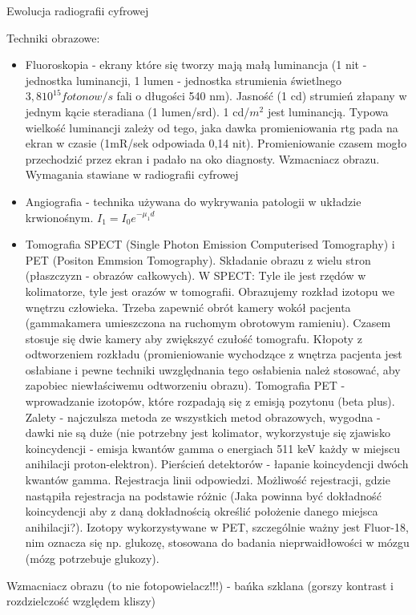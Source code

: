 \documentclass{article}
\begin{document}
Ewolucja radiografii cyfrowej

Techniki obrazowe:
\begin{itemize}
    \item Fluoroskopia - ekrany które się tworzy mają małą luminancja (1 nit - jednostka luminancji, 1 lumen - jednostka strumienia świetlnego $3,8 10^{15} fotonow/s$ fali o długości 540 nm). Jasność (1 cd) strumień złapany w jednym kącie steradiana (1 lumen\slash srd). 1 cd\slash $m^2$ jest luminancją. Typowa wielkość luminancji zależy od tego, jaka dawka promieniowania rtg pada na ekran w czasie (1mR/sek odpowiada 0,14 nit). Promieniowanie czasem mogło przechodzić przez ekran i padało na oko diagnosty. Wzmacniacz obrazu. Wymagania stawiane w radiografii cyfrowej
    \item Angiografia - technika używana do wykrywania patologii w układzie krwionośnym. $I_1 = I_0 e^{-\mu_1 d}$
    \item Tomografia SPECT (Single Photon Emission Computerised Tomography) i PET (Positon Emmsion Tomography). Składanie obrazu z wielu stron (płaszczyzn - obrazów całkowych). W SPECT: Tyle ile jest rzędów w kolimatorze, tyle jest orazów w tomografii. Obrazujemy rozkład izotopu we wnętrzu człowieka. Trzeba zapewnić obrót kamery wokół pacjenta (gammakamera umieszczona na ruchomym obrotowym ramieniu). Czasem stosuje się dwie kamery aby zwiększyć czułość tomografu. Kłopoty z odtworzeniem rozkładu (promieniowanie wychodzące z wnętrza pacjenta jest osłabiane i pewne techniki uwzględnania tego osłabienia należ stosować, aby zapobiec niewłaściwemu odtworzeniu obrazu). Tomografia PET - wprowadzanie izotopów, które rozpadają się z emisją pozytonu (beta plus). Zalety - najczulsza metoda ze wszystkich metod obrazowych, wygodna - dawki nie są duże (nie potrzebny jest kolimator, wykorzystuje się zjawisko koincydencji - emisja kwantów gamma o energiach 511 keV każdy w miejscu anihilacji proton-elektron). Pierścień detektorów - łapanie koincydencji dwóch kwantów gamma. Rejestracja linii odpowiedzi. Możliwość rejestracji, gdzie nastąpiła rejestracja na podstawie różnic (Jaka powinna być dokładność koincydencji aby z daną dokładnością określić położenie danego miejsca anihilacji?). Izotopy wykorzystywane w PET, szczególnie ważny jest Fluor-18, nim oznacza się np. glukozę, stosowana do badania nieprwaidłowości w mózgu (mózg potrzebuje glukozy).
\end{itemize}

Wzmacniacz obrazu (to nie fotopowielacz!!!) - bańka szklana (gorszy kontrast i rozdzielczość względem kliszy)
\end{document}
